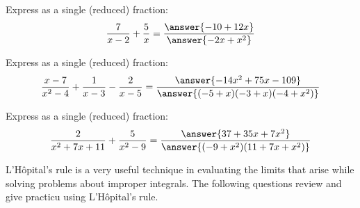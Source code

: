\documentclass{ximera}
\begin{document}
\begin{problem}
  Express as a single (reduced) fraction:
  \[
  \frac{7}{x-2}+\frac{5}{x} = \frac{\answer{-10+12x}}{\answer{-2x+x^2}}
  \]
\end{problem}


\begin{problem}
  Express as a single (reduced) fraction:
  \[
  \frac{x-7}{x^2-4} + \frac{1}{x-3} - \frac{2}{x-5} = \frac{\answer{-14x^2+75x-109}}{\answer{(-5 + x) (-3 + x) (-4 + x^2)}}
  \]
\end{problem}


\begin{problem}
  Express as a single (reduced) fraction:
  \[
  \frac{2}{x^2+7x+11} + \frac{5}{x^2-9} = \frac{\answer{37 + 35 x + 7 x^2}}{\answer{(-9 + x^2) (11 + 7 x + x^2)}}
  \]
\end{problem}

\begin{problem}
  L'H\^opital's rule is a very useful technique in evaluating the limits
  that arise while solving problems about improper integrals.  The
  following questions review and give practicu using L'H\^opital's rule.
  \begin{multipleChoice}
  \end{multipleChoice}
\end{problem}
\end{document}
